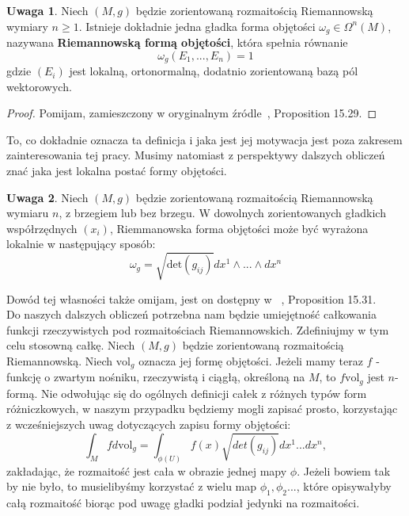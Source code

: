 \documentclass[licencjacka]{pracamgr}
\theoremstyle{definition}
\theoremstyle{definition}
\newtheorem{remark}{Uwaga}[section]
\theoremstyle{plain}
\theoremstyle{plain}
\theoremstyle{plain}
\theoremstyle{plain}
\begin{document}
\begin{remark}
Niech $(M, g)$ będzie zorientowaną rozmaitością Riemannowską wymiary
$n \geq 1$. Istnieje dokładnie jedna gładka forma objętości
$\omega_g \in \Omega^n(M)$, nazywana \textbf{Riemannowską formą objętości},
która spełnia równanie
\[
\omega_g(E_1, ...,  E_n) = 1
\]
gdzie $(E_i)$ jest lokalną, ortonormalną, dodatnio zorientowaną bazą
pól wektorowych.
\end{remark}
\begin{proof}
Pomijam, zamieszczony w oryginalnym źródle~\cite{lee}, Proposition 15.29.
\end{proof}

To, co dokładnie oznacza ta definicja i jaka jest jej motywacja jest poza
zakresem zainteresowania tej pracy. Musimy natomiast z perspektywy
dalszych obliczeń znać jaka jest lokalna postać formy objętości.

\begin{remark}\label{expression-for-volume-form}
Niech $(M, g)$ będzie zorientowaną rozmaitością Riemannowską wymiaru $n$, z
brzegiem lub bez brzegu. W dowolnych zorientowanych gładkich współrzędnych
$(x_i)$, Riemmanowska forma objętości może być wyrażona lokalnie w następujący
sposób:
\[
    \omega_g = \sqrt{\text{det}(g_{ij})} dx^1 \wedge ... \wedge dx^n
\]
\end{remark}
Dowód tej własności także omijam, jest on dostępny w ~\cite{lee}, Proposition
15.31. \\

Do naszych dalszych obliczeń potrzebna nam będzie umiejętność całkowania
funkcji rzeczywistych pod rozmaitościach Riemannowskich. Zdefiniujmy w tym celu
stosowną całkę.
Niech $(M, g)$ będzie zorientowaną rozmaitością Riemannowską. 
Niech $\text{vol}_g$ oznacza jej formę objętości. Jeżeli mamy teraz $f$ -
funkcję o zwartym nośniku, rzeczywistą i ciągłą, określoną na $M$, to
$f \text{vol}_g$ jest $n$-formą.
Nie odwołując się do ogólnych definicji całek z różnych typów form
różniczkowych, w naszym przypadku będziemy mogli zapisać prosto, korzystając z
wcześniejszych uwag dotyczących zapisu formy objętości:
\[ %
  \int_M f d \text{vol}_g = \int_{\phi (U)} f(x) \sqrt{det(g_{ij})} dx^1 ... dx^n,
\]
zakładając, że rozmaitość jest cała w obrazie jednej mapy
$\phi$. Jeżeli bowiem tak by nie było, to musielibyśmy korzystać z
wielu map $\phi_1, \phi_2 ... $, które opisywałyby całą rozmaitość
biorąc pod uwagę gładki podział jedynki na rozmaitości. \\
\end{document}
